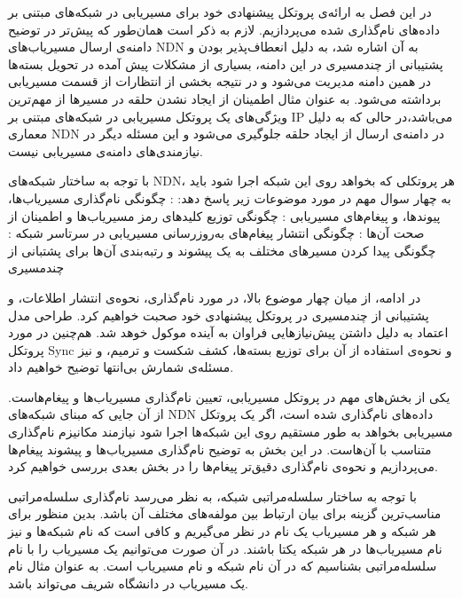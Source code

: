 

در این فصل به ارائه‌ی پروتکل پیشنهادی خود برای مسیریابی در شبکه‌های مبتنی بر داده‌های نام‌گذاری شده می‌پردازیم. لازم به ذکر است همان‌طور که پیش‌تر در توضیح دامنه‌ی ارسال مسیریاب‌های NDN به آن اشاره شد، به دلیل انعطاف‌پذیر بودن و پشتیبانی از چندمسیری در این دامنه‌، بسیاری از مشکلات پیش آمده در تحویل بسته‌ها در همین دامنه مدیریت می‌شود و در نتیجه بخشی از انتظارات از قسمت مسیریابی برداشته می‌شود. به عنوان مثال اطمینان از ایجاد نشدن حلقه در مسیرها از مهم‌ترین ویژگی‌های یک پروتکل مسیریابی در شبکه‌های مبتنی بر IP می‌باشد،در حالی که به دلیل معماری NDN در دامنه‌ی ارسال از ایجاد حلقه جلوگیری می‌شود و این مسئله دیگر در نیازمندی‌های دامنه‌ی مسیریابی نیست. 

 با توجه به ساختار شبکه‌های NDN، هر پروتکلی که بخواهد روی این شبکه اجرا شود باید به چهار سوال مهم در مورد موضوعات زیر پاسخ دهد:
 : چگونگی نام‌گذاری مسیریاب‌ها، پیوند‌ها، و پیغام‌های مسیریابی
 : چگونگی توزیع کلید‌های رمز مسیریاب‌ها و اطمینان از صحت آن‌ها
 : چگونگی انتشار پیغام‌های به‌روزرسانی مسیریابی در سرتاسر شبکه
 : چگونگی پیدا کردن مسیرهای مختلف به یک پیشوند و رتبه‌بندی آن‌ها برای پشتبانی از چندمسیری

در ادامه، از میان چهار موضوع بالا، در مورد نام‌گذاری، نحوه‌ی انتشار اطلاعات، و پشتیبانی از چندمسیری در پروتکل پیشنهادی خود صحبت خواهیم کرد. طراحی مدل اعتماد به دلیل داشتن  پیش‌نیازهایی فراوان به آینده موکول خوهد شد. هم‌چنین در مورد پروتکل Sync و نحوه‌ی استفاده از آن برای توزیع بسته‌ها، کشف شکست و ترمیم، و نیز مسئله‌ی شمارش بی‌انتها توضیح خواهیم داد.


یکی از بخش‌های مهم در پروتکل مسیریابی، تعیین نام‌گذاری مسیریاب‌ها و پیغام‌هاست. از آن جایی که مبنای شبکه‌های NDN داده‌های نام‌گذاری شده است، اگر یک پروتکل مسیریابی بخواهد به طور مستقیم روی این شبکه‌ها اجرا شود نیازمند مکانیزم نام‌گذاری متناسب با آن‌هاست. در این بخش به توضیح نام‌گذاری مسیریاب‌ها و پیشوند پیغام‌ها می‌پردازیم و نحوه‌ی نام‌گذاری دقیق‌تر پیغام‌ها را در بخش بعدی بررسی خواهیم کرد. 

با توجه به ساختار سلسله‌مراتبی شبکه، به نظر می‌رسد نام‌گذاری سلسله‌مراتبی مناسب‌ترین گزینه برای بیان ارتباط بین مولفه‌های مختلف آن باشد. بدین منظور برای هر شبکه و هر مسیریاب یک نام در نظر می‌گیریم و کافی است که نام شبکه‌ها و نیز نام مسیریاب‌ها در هر شبکه یکتا باشند. در آن صورت می‌توانیم یک مسیریاب را با نام سلسله‌مراتبی  بشناسیم که در آن  نام شبکه و  نام مسیریاب است. به عنوان مثال نام یک مسیریاب در دانشگاه شریف می‌تواند  باشد. 

